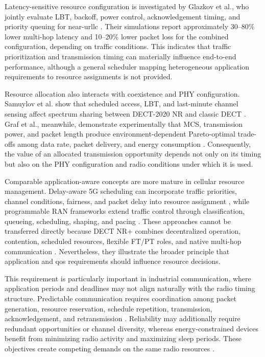 Latency-sensitive resource configuration is investigated by Glazkov et al.,
who jointly evaluate LBT, backoff, power control, acknowledgement timing, and
priority queuing for near-\gls{urllc}
\cite{glazkovImprovingNearURLLCServices2025}. Their simulations report
approximately 30--80\% lower multi-hop latency and 10--20\% lower packet loss
for the combined configuration, depending on traffic conditions. This
indicates that traffic prioritization and transmission timing can materially
influence end-to-end performance, although a general scheduler mapping
heterogeneous application requirements to resource assignments is not
provided.

Resource allocation also interacts with coexistence and PHY configuration.
Samuylov et al. show that scheduled access, LBT, and last-minute channel
sensing affect spectrum sharing between DECT-2020 NR and classic DECT
\cite{samuylovPerformanceAssessmentDECT20202023}. Graf et al., meanwhile,
demonstrate experimentally that MCS, transmission power, and packet length
produce environment-dependent Pareto-optimal trade-offs among data rate,
packet delivery, and energy consumption
\cite{grafParetoOptimalityApproach2026a}. Consequently, the value of an
allocated transmission opportunity depends not only on its timing but also on
the PHY configuration and radio conditions under which it is used.

Comparable application-aware concepts are more mature in cellular resource
management. Delay-aware 5G scheduling can incorporate traffic priorities,
channel conditions, fairness, and packet delay into resource assignment
\cite{madiDelayBasedResourceAllocation2022a}, while programmable RAN
frameworks extend traffic control through classification, queueing,
scheduling, shaping, and pacing
\cite{irazabalTCRANProgrammableTraffic2024}. These approaches cannot be
transferred directly because DECT NR+ combines decentralized operation,
contention, scheduled resources, flexible FT/PT roles, and native multi-hop
communication
\cite{etsi_ts103636_1,etsi_ts103636_4}. Nevertheless, they illustrate the
broader principle that application and \gls{qos} requirements should influence
resource decisions.

This requirement is particularly important in industrial communication,
where application periods and deadlines may not align naturally with the
radio timing structure. Predictable communication requires coordination among
packet generation, resource reservation, schedule repetition, transmission,
acknowledgement, and retransmission
\cite{etsi_ts103636_3,etsi_ts103636_4}. Reliability may additionally require
redundant opportunities or channel diversity, whereas energy-constrained
devices benefit from minimizing radio activity and maximizing sleep periods.
These objectives create competing demands on the same radio resources
\cite{glazkovImprovingNearURLLCServices2025,
samuylovEmpoweringNearURLLCIoT2025,
grafParetoOptimalityApproach2026a}.

